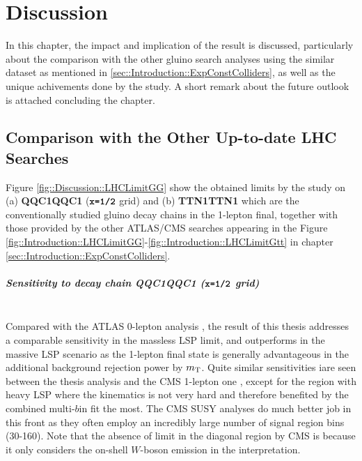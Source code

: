 \chapter{Discussion} \label{sec::Discussion}
In this chapter, the impact and implication of the result is discussed,
particularly about the comparison with the other gluino search analyses using the similar dataset as mentioned in \ref{sec::Introduction::ExpConstColliders},
as well as the unique achivements done by the study.
A short remark about the future outlook is attached concluding the chapter. \\

\section{Comparison with the Other Up-to-date LHC Searches}
Figure \ref{fig::Discussion::LHCLimitGG} show the obtained limits by the study on (a) \textbf{QQC1QQC1} ($\mathrm{\textbf{\texttt{x=1/2}}}$ grid) and (b) \textbf{TTN1TTN1} which are the conventionally studied gluino decay chains in the 1-lepton final,
together with those provided by the other ATLAS/CMS searches appearing in the Figure \ref{fig::Introduction::LHCLimitGG}-\ref{fig::Introduction::LHCLimitGtt} in chapter \ref{sec::Introduction::ExpConstColliders}.
\paragraph{Sensitivity to decay chain \textbf{QQC1QQC1} ($\mathrm{\textbf{\texttt{x=1/2}}}$ grid)} \mbox{} \\
Compared with the ATLAS 0-lepton analysis \cite{ATLAS_SUSY_strong0L}, 
the result of this thesis addresses a comparable sensitivity in the massless LSP limit,
and outperforms in the massive LSP scenario as the 1-lepton final state is generally advantageous in the additional background rejection power by $m_{\mathrm{T}}$. 
%
Quite similar sensitivities iare seen between the thesis analysis and the CMS 1-lepton one \cite{CMS_SUSY_strong1L_dPhi}, 
except for the region with heavy LSP where the kinematics is not very hard and therefore benefited by the combined multi-$b$in fit the most.
The CMS SUSY analyses do much better job in this front as they often employ an incredibly large number of signal region bins (30-160).
Note that the absence of limit in the diagonal region by CMS is because it only considers the on-shell $W$-boson emission in the interpretation. 




